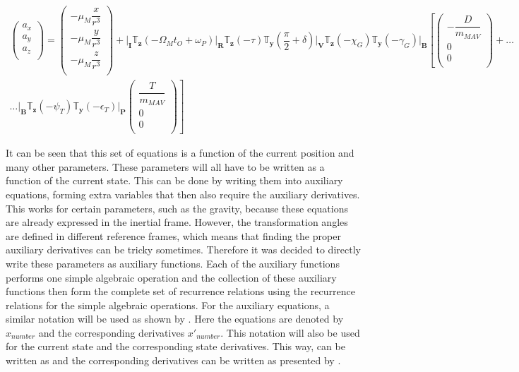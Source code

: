 \begin{multline} \label{eq:acc}
\begin{pmatrix}
a_{x}\\
a_{y}\\
a_{z}\\
\end{pmatrix}
=
\begin{pmatrix}
-\mu_{M}\dfrac{x}{r^{3}}\\
-\mu_{M}\dfrac{y}{r^{3}}\\
-\mu_{M}\dfrac{z}{r^{3}}\\
\end{pmatrix}+
\Bigg|_{\mathbf{I}}\mathbb{T}_{\mathbf{z}}\left(-\Omega_{M}t_{O}+\omega_{P}\right)\Bigg|_{\mathbf{R}}\mathbb{T}_{\mathbf{z}}\left(-\tau\right)\mathbb{T}_{\mathbf{y}}\left(\dfrac{\pi}{2}+\delta\right)\Bigg|_{\mathbf{V}}\mathbb{T}_{\mathbf{z}}\left(-\chi_{G}\right)\mathbb{T}_{\mathbf{y}}\left(-\gamma_{G}\right)\Bigg|_{\mathbf{B}}\left[
\begin{pmatrix}
-\dfrac{D}{m_{MAV}}\\
0\\
0\\
\end{pmatrix}
+  \right. \dots \\
\dotsc
 \left.
\Bigg|_{\mathbf{B}}\mathbb{T}_{\mathbf{z}}\left(-\psi_{T}\right)\mathbb{T}_{\mathbf{y}}\left(-\epsilon_{T}\right)\Bigg|_{\mathbf{P}}
\begin{pmatrix}
\dfrac{T}{m_{MAV}}\\
0\\
0\\
\end{pmatrix}
\right]
\end{multline}

\noindent
It can be seen that this set of equations is a function of the current position and many other parameters. These parameters will all have to be written as a function of the current state. This can be done by writing them into auxiliary equations, forming extra variables that then also require the auxiliary derivatives. This works for certain parameters, such as the gravity, because these equations are already expressed in the inertial frame. However, the transformation angles are defined in different reference frames, which means that finding the proper auxiliary derivatives can be tricky sometimes. Therefore it was decided to directly write these parameters as auxiliary functions. Each of the auxiliary functions performs one simple algebraic operation and the collection of these auxiliary functions then form the complete set of recurrence relations using the recurrence relations for the simple algebraic operations. For the auxiliary equations, a similar notation will be used as shown by \cite{scott2008high}. Here the equations are denoted by $x_{number}$ and the corresponding derivatives $x'_{number}$. This notation will also be used for the current state and the corresponding state derivatives. This way,  can be written as  and the corresponding derivatives can be written as presented by .

